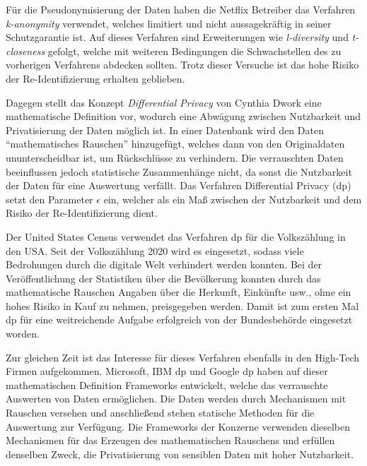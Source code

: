 Für die Pseudonymisierung der Daten haben die Netflix Betreiber das Verfahren \textit{k-anonymity} verwendet, welches limitiert und nicht aussagekräftig in seiner Schutzgarantie ist.
Auf dieses Verfahren sind Erweiterungen wie \textit{l-diversity} \parencite{L-Diversity} und \textit{t-closeness} \parencite{T-Closeness} gefolgt, welche mit weiteren Bedingungen die Schwachstellen des zu vorherigen Verfahrens abdecken sollten. Trotz dieser Versuche ist das hohe Risiko der Re-Identifizierung erhalten geblieben.


Dagegen stellt das Konzept \textit{Differential Privacy} von  Cynthia Dwork \parencite{Dwork2006} eine mathematische Definition vor, wodurch eine Abwägung zwischen Nutzbarkeit und Privatisierung der Daten möglich ist. In einer Datenbank wird den Daten \enquote{mathematisches Rauschen} hinzugefügt, welches dann von den Originaldaten ununterscheidbar ist, um Rückschlüsse zu verhindern. Die verrauschten Daten beeinflussen jedoch statistische Zusammenhänge nicht, da sonst die Nutzbarkeit der Daten für eine Auswertung verfällt. Das Verfahren Differential Privacy (\gls{dp}) setzt den Parameter $\epsilon$ ein, welcher als ein Maß zwischen der Nutzbarkeit und dem Risiko der Re-Identifizierung dient.


Der United States Census \parencite{USC} verwendet das Verfahren \gls{dp} für die Volkszählung in den USA. Seit der Volkszählung 2020 wird es eingesetzt, sodass viele Bedrohungen durch die digitale Welt verhindert werden konnten. Bei der Veröffentlichung der Statistiken über die Bevölkerung konnten durch das mathematische Rauschen Angaben über die Herkunft, Einkünfte usw., ohne ein hohes Risiko in Kauf zu nehmen, preisgegeben werden. Damit ist zum ersten Mal \gls{dp} für eine weitreichende Aufgabe erfolgreich von der Bundesbehörde eingesetzt worden.


Zur gleichen Zeit ist das Interesse für dieses Verfahren ebenfalls in den High-Tech Firmen aufgekommen. Microsoft, IBM \gls{dp} und Google \gls{dp} haben auf dieser mathematischen Definition Frameworks entwickelt, welche das verrauschte Auswerten von Daten ermöglichen. Die Daten werden durch Mechanismen mit Rauschen versehen und anschließend stehen statische Methoden für die Auswertung zur Verfügung. Die Frameworks der Konzerne verwenden dieselben Mechanismen für das Erzeugen des mathematischen Rauschens und erfüllen denselben Zweck, die Privatisierung von sensiblen Daten mit hoher Nutzbarkeit. 

